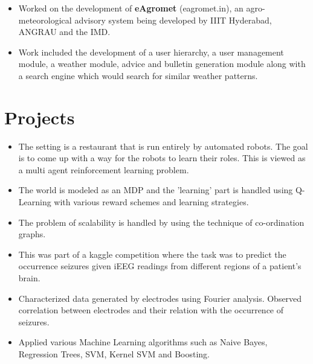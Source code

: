 \documentclass[10pt,a4paper,sans]{moderncv}
\begin{document}

{
\begin{itemize}
\item Worked on the development of \textbf{eAgromet} (eagromet.in), an
agro-meteorological advisory system being developed by IIIT Hyderabad, ANGRAU
and the IMD.
\item Work included the development of a user hierarchy, a user management
module, a weather module, advice and bulletin generation module along with a
search engine which would search for similar weather patterns.
\end{itemize}}



\section{Projects}
{
\begin{itemize}
\item The setting is a restaurant that is run entirely by automated robots. The
goal is to come up with a way for the robots to learn their roles. This is
viewed as a multi agent reinforcement learning problem.
\item The world is modeled as an MDP and the 'learning' part is handled using
Q-Learning with various reward schemes and learning strategies.
\item The problem of scalability is handled by using the technique of
co-ordination graphs.
\end{itemize}}

{
\begin{itemize}
\item This was part of a kaggle competition where the task was to predict the
occurrence seizures given iEEG readings from different regions of a patient's
brain.
\item Characterized data generated by electrodes using Fourier analysis.
Observed correlation between electrodes and their relation with the occurrence
of seizures.
\item Applied various Machine Learning algorithms such as Naive Bayes,
Regression Trees, SVM, Kernel SVM and Boosting.
\end{itemize}}
\end{document}
